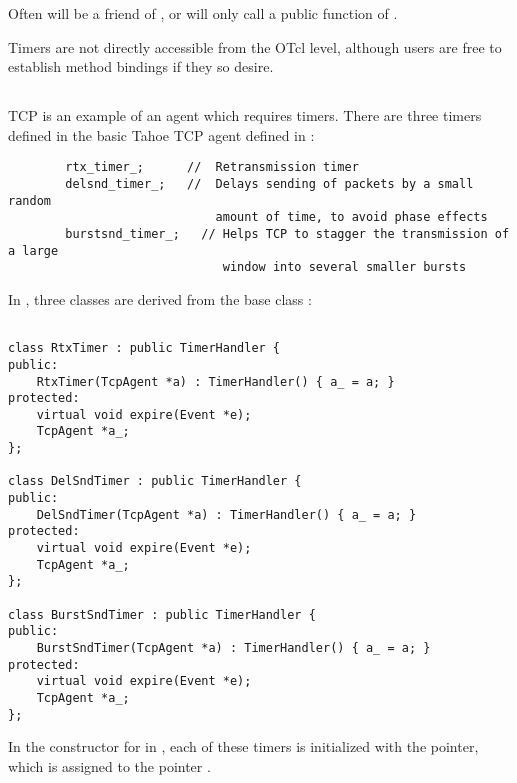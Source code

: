 Often  will be a friend of , or 
 will only call a public function of .

Timers are not directly accessible from the OTcl level, although users are
free to establish method bindings if they so desire.

\subsection{}

TCP is an example of an agent which requires timers.  There are three timers
defined in the basic Tahoe TCP agent defined in :

\begin{small}
\begin{verbatim}
        rtx_timer_;      //  Retransmission timer
        delsnd_timer_;   //  Delays sending of packets by a small random
                             amount of time, to avoid phase effects
        burstsnd_timer_;   // Helps TCP to stagger the transmission of a large
                              window into several smaller bursts
\end{verbatim}
\end{small}

In , three classes are derived from the base class 
:
\begin{small}
\begin{verbatim}

class RtxTimer : public TimerHandler {
public:
    RtxTimer(TcpAgent *a) : TimerHandler() { a_ = a; }
protected:                   
    virtual void expire(Event *e);
    TcpAgent *a_;
};  
    
class DelSndTimer : public TimerHandler {
public:
    DelSndTimer(TcpAgent *a) : TimerHandler() { a_ = a; }
protected:
    virtual void expire(Event *e);
    TcpAgent *a_;
};      
    
class BurstSndTimer : public TimerHandler {
public: 
    BurstSndTimer(TcpAgent *a) : TimerHandler() { a_ = a; }
protected:
    virtual void expire(Event *e); 
    TcpAgent *a_;
};  

\end{verbatim}
\end{small}

In the constructor for  in , each of these timers
is initialized with the  pointer, which is assigned to the pointer
.

